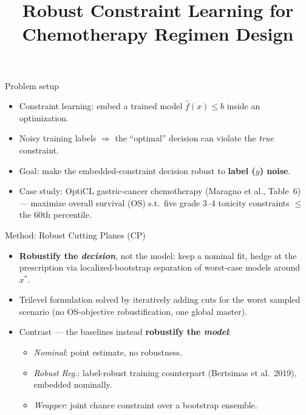 \documentclass{beamer}
\title{Robust Constraint Learning for Chemotherapy Regimen Design}
\date{}
\begin{document}
\begin{frame}
  \titlepage
\end{frame}

\begin{frame}{Problem setup}
  \begin{itemize}
  \item Constraint learning: embed a trained model $\hat f(x)\le b$ inside an optimization.
  \item Noisy training labels $\Rightarrow$ the ``optimal'' decision can violate the \emph{true} constraint.
  \item Goal: make the embedded-constraint decision robust to \textbf{label ($y$) noise}.
  \item Case study: OptiCL gastric-cancer chemotherapy (Maragno et al., Table~6) --- maximize
    overall survival (OS) s.t.\ five grade 3--4 toxicity constraints $\le$ the 60th percentile.
  \end{itemize}
\end{frame}

\begin{frame}{Method: Robust Cutting Planes (CP)}
  \begin{itemize}
  \item \textbf{Robustify the \emph{decision}}, not the model: keep a nominal fit, hedge at the
    prescription via localized-bootstrap separation of worst-case models around $x^\ast$.
  \item Trilevel formulation solved by iteratively adding cuts for the worst sampled scenario
    (no OS-objective robustification, one global master).
  \item Contrast --- the baselines instead \textbf{robustify the \emph{model}}:
    \begin{itemize}
    \item \emph{Nominal}: point estimate, no robustness.
    \item \emph{Robust Reg.}: label-robust training counterpart (Bertsimas et al.\ 2019), embedded nominally.
    \item \emph{Wrapper}: joint chance constraint over a bootstrap ensemble.
    \end{itemize}
  \end{itemize}
\end{frame}
\end{document}
